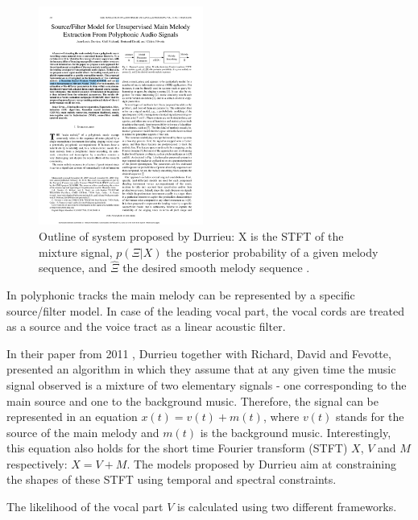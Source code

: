 \begin{figure}
  \vspace{-50pt}

  \begin{center}
    \includegraphics[width=0.48\textwidth]{Figures/durrieudiagram}
  \end{center}
  \caption{Outline of system proposed by Durrieu: X is the STFT of the mixture signal, $p(\Xi|X)$ the posterior probability of a given melody sequence, and $\hat{\Xi} $ the desired smooth melody sequence \cite{durrieu}.}
  \label{fig:durrieu}
\end{figure}


In polyphonic tracks the main melody can be represented by a specific source/filter model. In case of the leading vocal part, the vocal cords are treated as a source and the voice tract as a linear acoustic filter.

In their paper from 2011 \cite{durrieu}, Durrieu together with Richard, David and Fevotte, presented an algorithm in which they assume that at any given time the music signal observed is a mixture of two elementary signals - one corresponding to the main source and one to the background music. Therefore, the signal can be represented in an equation $x(t) = v(t) + m(t)$, where $v(t)$ stands for the source of the main melody and $m(t)$ is the background music. Interestingly, this equation also holds for the short time Fourier transform (STFT)  $X$, $V$ and $M$ respectively: $X = V + M$. The models proposed by Durrieu aim at constraining the shapes of these STFT using temporal and spectral constraints. 

The likelihood of the vocal part $V$ is calculated using two different frameworks. 

